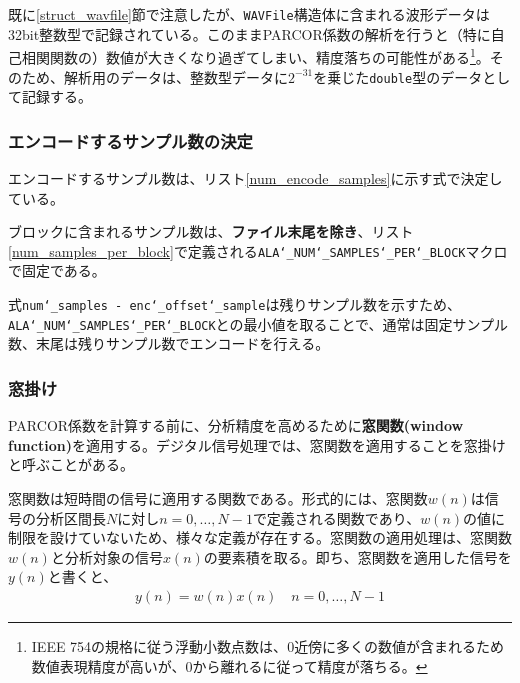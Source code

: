 \documentclass[uplatex,dvipdfmx,b5j,10pt]{jsbook}
\theoremstyle{definition}
\begin{document}


既に\ref{struct_wavfile}節で注意したが、\texttt{WAVFile}構造体に含まれる波形データは32bit整数型で記録されている。このままPARCOR係数の解析を行うと（特に自己相関関数の）数値が大きくなり過ぎてしまい、精度落ちの可能性がある\footnote{IEEE 754の規格に従う浮動小数点数は、$0$近傍に多くの数値が含まれるため数値表現精度が高いが、$0$から離れるに従って精度が落ちる\cite{floatdensity}。}。そのため、解析用のデータは、整数型データに$2^{-31}$を乗じた\texttt{double}型のデータとして記録する。

\subsubsection{エンコードするサンプル数の決定}

エンコードするサンプル数は、リスト\ref{num_encode_samples}に示す式で決定している。


ブロックに含まれるサンプル数は、\textbf{ファイル末尾を除き}、リスト\ref{num_samples_per_block}で定義される\texttt{ALA\char`_NUM\char`_SAMPLES\char`_PER\char`_BLOCK}マクロで固定である。


式\texttt{num\char`_samples - enc\char`_offset\char`_sample}は残りサンプル数を示すため、\texttt{ALA\char`_NUM\char`_SAMPLES\char`_PER\char`_BLOCK}との最小値を取ることで、通常は固定サンプル数、末尾は残りサンプル数でエンコードを行える。

\subsubsection{窓掛け}

PARCOR係数を計算する前に、分析精度を高めるために\textbf{窓関数(window function)}を適用する。デジタル信号処理では、窓関数を適用することを窓掛けと呼ぶことがある。

窓関数は短時間の信号に適用する関数である。形式的には、窓関数$w(n)$は信号の分析区間長$N$に対し$n = 0,\dots,N-1$で定義される関数であり、$w(n)$の値に制限を設けていないため、様々な定義が存在する。窓関数の適用処理は、窓関数$w(n)$と分析対象の信号$x(n)$の要素積を取る。即ち、窓関数を適用した信号を$y(n)$と書くと、
\begin{eqnarray} 
  y(n) = w(n) x(n) \quad n = 0,\dots,N-1 \label{apply_window}
\end{eqnarray}
\end{document}
